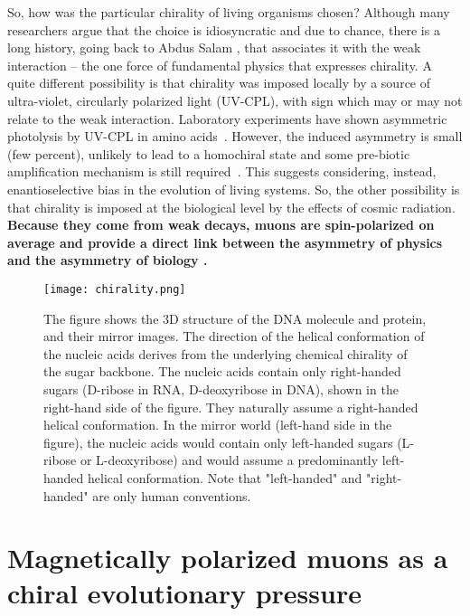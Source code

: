 \documentclass[a4paper,11pt]{article}
\begin{document}
So, how was the particular chirality of living organisms  chosen? Although many researchers argue that the choice is idiosyncratic and due to chance, there is a long history, going back to Abdus Salam \cite{1991JMolE..33..105S},  that associates it with the weak interaction – the one force of fundamental physics that expresses chirality. A quite different possibility is that chirality was imposed locally by a source of ultra-violet, circularly polarized light (UV-CPL), with sign which may or may not relate to the weak interaction. Laboratory experiments have shown asymmetric photolysis by UV-CPL in amino acids~\cite{deMarcellus}. However, the induced asymmetry is small (few percent), unlikely to lead to a homochiral state and some pre-biotic amplification mechanism is still required~\cite[{\it e.g.},][]{soai1995}. This suggests considering, instead, enantioselective bias in the evolution of living systems.  So, the other possibility is that  chirality is imposed at the biological level by the effects of cosmic radiation. {\bf Because they come from weak decays, muons are spin-polarized on average \cite{1993APh.....1..195L} and provide a direct link between the asymmetry of physics and the asymmetry of biology \cite{GB20}.} 

 
 
 \begin{figure}
\centering
       \texttt{[image: chirality.png]}
\caption{The figure shows the 3D structure of the DNA molecule and protein, and their mirror images.   The direction of the helical conformation of the nucleic acids derives from the underlying chemical chirality of the sugar backbone. The nucleic acids  contain only  right-handed sugars (D-ribose in RNA, D-deoxyribose in DNA), shown in the right-hand side of the figure. They naturally assume a right-handed helical conformation.  
In the mirror world (left-hand side in the figure), the nucleic acids would contain only left-handed sugars (L-ribose or L-deoxyribose) and would assume a predominantly  left-handed helical conformation. Note that "left-handed" and "right-handed" are only human conventions.}
\label{fig:chirality}
\end{figure}
 
 
 
 
 \section{Magnetically polarized muons as a chiral evolutionary pressure}
\end{document}
